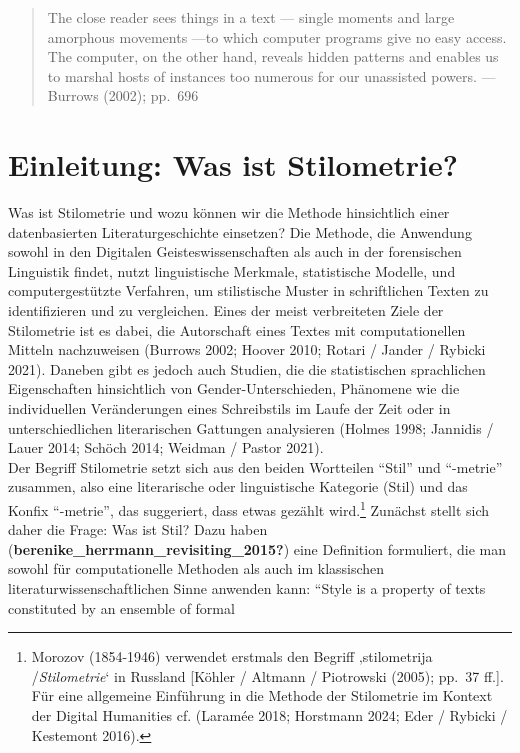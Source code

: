 \documentclass[
  12pt,
  letterpaper,
  DIV=11,
  numbers=noendperiod]{scrreprt}
\begin{document}
\begin{quote}
The close reader sees things in a text --- single moments and large
amorphous movements ---to which computer programs give no easy access.
The computer, on the other hand, reveals hidden patterns and enables us
to marshal hosts of instances too numerous for our unassisted powers.
--- Burrows (2002); pp.~696
\end{quote}

\section{Einleitung: Was ist
Stilometrie?}\label{einleitung-was-ist-stilometrie}

Was ist Stilometrie und wozu können wir die Methode hinsichtlich einer
datenbasierten Literaturgeschichte einsetzen? Die Methode, die Anwendung
sowohl in den Digitalen Geisteswissenschaften als auch in der
forensischen Linguistik findet, nutzt linguistische Merkmale,
statistische Modelle, und computergestützte Verfahren, um stilistische
Muster in schriftlichen Texten zu identifizieren und zu vergleichen.
Eines der meist verbreiteten Ziele der Stilometrie
ist es dabei, die Autorschaft eines Textes mit computationellen Mitteln
nachzuweisen (Burrows 2002; Hoover 2010; Rotari / Jander / Rybicki
2021). Daneben gibt es jedoch auch Studien, die die statistischen
sprachlichen Eigenschaften hinsichtlich von Gender-Unterschieden,
Phänomene wie die individuellen Veränderungen eines Schreibstils im
Laufe der Zeit oder in unterschiedlichen literarischen Gattungen
analysieren (Holmes 1998; Jannidis / Lauer 2014; Schöch 2014; Weidman /
Pastor 2021).\\
Der Begriff Stilometrie setzt sich aus den beiden Wortteilen ``Stil''
und ``-metrie'' zusammen, also eine literarische oder linguistische
Kategorie (Stil) und das Konfix ``-metrie'', das suggeriert, dass etwas
gezählt wird.\footnote{Morozov (1854-1946) verwendet erstmals den
  Begriff ‚stilometrija /\emph{Stilometrie}` in Russland {[}Köhler /
  Altmann / Piotrowski (2005); pp.~37 ff.{]}. Für eine allgemeine
  Einführung in die Methode der Stilometrie im Kontext der Digital
  Humanities cf. (Laramée 2018; Horstmann 2024; Eder / Rybicki /
  Kestemont 2016).} Zunächst stellt sich daher die Frage: Was ist Stil?
Dazu haben (\textbf{berenike\_herrmann\_revisiting\_2015?}) eine
Definition formuliert, die man sowohl für computationelle Methoden als
auch im klassischen literaturwissenschaftlichen Sinne anwenden kann:
``Style is a property of texts constituted by an ensemble of formal
\end{document}
